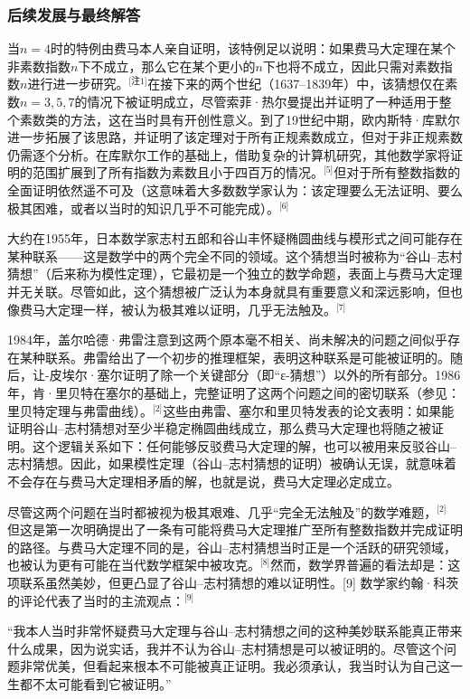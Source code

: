 \subsubsection{后续发展与最终解答}
当\(n = 4\)时的特例由费马本人亲自证明，该特例足以说明：如果费马大定理在某个非素数指数\(n\)下不成立，那么它在某个更小的\(n\)下也将不成立，因此只需对素数指数\(n\)进行进一步研究。\(^\text{[注1]}\)在接下来的两个世纪（1637–1839年）中，该猜想仅在素数\(n = 3, 5, 7\)的情况下被证明成立，尽管索菲·热尔曼提出并证明了一种适用于整个素数类的方法，这在当时具有开创性意义。到了19世纪中期，欧内斯特·库默尔进一步拓展了该思路，并证明了该定理对于所有正规素数成立，但对于非正规素数仍需逐个分析。在库默尔工作的基础上，借助复杂的计算机研究，其他数学家将证明的范围扩展到了所有指数为素数且小于四百万的情况。\(^\text{[5]}\)但对于所有整数指数的全面证明依然遥不可及（这意味着大多数数学家认为：该定理要么无法证明、要么极其困难，或者以当时的知识几乎不可能完成）。\(^\text{[6]}\)

大约在1955年，日本数学家志村五郎和谷山丰怀疑椭圆曲线与模形式之间可能存在某种联系——这是数学中的两个完全不同的领域。这个猜想当时被称为“谷山–志村猜想”（后来称为模性定理），它最初是一个独立的数学命题，表面上与费马大定理并无关联。尽管如此，这个猜想被广泛认为本身就具有重要意义和深远影响，但也像费马大定理一样，被认为极其难以证明，几乎无法触及。\(^\text{[7]}\)

1984年，盖尔哈德·弗雷注意到这两个原本毫不相关、尚未解决的问题之间似乎存在某种联系。弗雷给出了一个初步的推理框架，表明这种联系是可能被证明的。随后，让-皮埃尔·塞尔证明了除一个关键部分（即“ε-猜想”）以外的所有部分。1986年，肯·里贝特在塞尔的基础上，完整证明了这两个问题之间的密切联系（参见：里贝特定理与弗雷曲线）。\(^\text{[2]}\)这些由弗雷、塞尔和里贝特发表的论文表明：如果能证明谷山–志村猜想对至少半稳定椭圆曲线成立，那么费马大定理也将随之被证明。这个逻辑关系如下：任何能够反驳费马大定理的解，也可以被用来反驳谷山–志村猜想。因此，如果模性定理（谷山–志村猜想的证明）被确认无误，就意味着不会存在与费马大定理相矛盾的解，也就是说，费马大定理必定成立。

尽管这两个问题在当时都被视为极其艰难、几乎“完全无法触及”的数学难题，\(^\text{[2]}\) 但这是第一次明确提出了一条有可能将费马大定理推广至所有整数指数并完成证明的路径。与费马大定理不同的是，谷山–志村猜想当时正是一个活跃的研究领域，也被认为更有可能在当代数学框架中被攻克。\(^\text{[8]}\)然而，数学界普遍的看法却是：这项联系虽然美妙，但更凸显了谷山–志村猜想的难以证明性。[9] 数学家约翰·科茨的评论代表了当时的主流观点：\(^\text{[9]}\)

“我本人当时非常怀疑费马大定理与谷山–志村猜想之间的这种美妙联系能真正带来什么成果，因为说实话，我并不认为谷山–志村猜想是可以被证明的。尽管这个问题非常优美，但看起来根本不可能被真正证明。我必须承认，我当时认为自己这一生都不太可能看到它被证明。”

